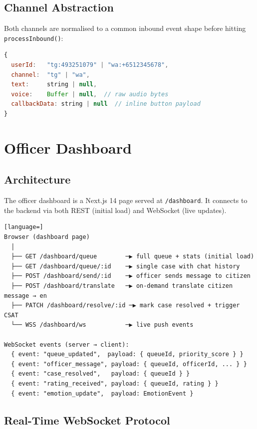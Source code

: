 \documentclass[12pt,a4paper]{article}
\begin{document}
\subsection{Channel Abstraction}

Both channels are normalised to a common inbound event shape before hitting \texttt{processInbound()}:
\begin{lstlisting}[language=JavaScript]
{
  userId:   "tg:493251079" | "wa:+6512345678",
  channel:  "tg" | "wa",
  text:     string | null,
  voice:    Buffer | null,  // raw audio bytes
  callbackData: string | null  // inline button payload
}
\end{lstlisting}

\section{Officer Dashboard}
\label{sec:dashboard}

\subsection{Architecture}

The officer dashboard is a Next.js 14 page served at \texttt{/dashboard}.
It connects to the backend via both REST (initial load) and WebSocket (live updates).

\begin{lstlisting}[language=]
Browser (dashboard page)
  │
  ├── GET /dashboard/queue        ─▶ full queue + stats (initial load)
  ├── GET /dashboard/queue/:id    ─▶ single case with chat history
  ├── POST /dashboard/send/:id    ─▶ officer sends message to citizen
  ├── POST /dashboard/translate   ─▶ on-demand translate citizen message → en
  ├── PATCH /dashboard/resolve/:id ─▶ mark case resolved + trigger CSAT
  └── WSS /dashboard/ws           ─▶ live push events

WebSocket events (server → client):
  { event: "queue_updated",  payload: { queueId, priority_score } }
  { event: "officer_message", payload: { queueId, officerId, ... } }
  { event: "case_resolved",   payload: { queueId } }
  { event: "rating_received", payload: { queueId, rating } }
  { event: "emotion_update",  payload: EmotionEvent }
\end{lstlisting}

\subsection{Real-Time WebSocket Protocol}
\end{document}
